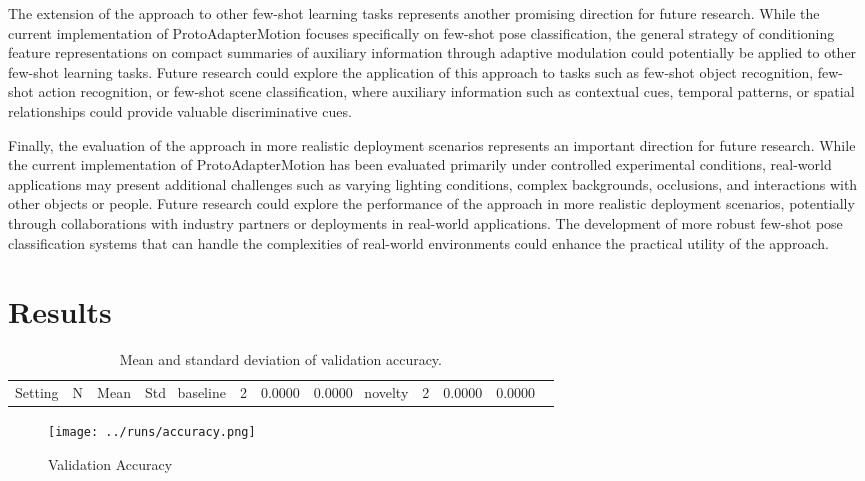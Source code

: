 \documentclass[11pt]{article}
\begin{document}
The extension of the approach to other few-shot learning tasks represents another promising direction for future research. While the current implementation of ProtoAdapterMotion focuses specifically on few-shot pose classification, the general strategy of conditioning feature representations on compact summaries of auxiliary information through adaptive modulation could potentially be applied to other few-shot learning tasks. Future research could explore the application of this approach to tasks such as few-shot object recognition, few-shot action recognition, or few-shot scene classification, where auxiliary information such as contextual cues, temporal patterns, or spatial relationships could provide valuable discriminative cues.

Finally, the evaluation of the approach in more realistic deployment scenarios represents an important direction for future research. While the current implementation of ProtoAdapterMotion has been evaluated primarily under controlled experimental conditions, real-world applications may present additional challenges such as varying lighting conditions, complex backgrounds, occlusions, and interactions with other objects or people. Future research could explore the performance of the approach in more realistic deployment scenarios, potentially through collaborations with industry partners or deployments in real-world applications. The development of more robust few-shot pose classification systems that can handle the complexities of real-world environments could enhance the practical utility of the approach.
\section*{Results}
\begin{table}[h!]\centering\begin{tabular}{lrrr}\hline Setting & N & Mean & Std \ \hline baseline & 2 & 0.0000 & 0.0000 \  novelty & 2 & 0.0000 & 0.0000 \  \hline\end{tabular}\caption{Mean and standard deviation of validation accuracy.}\end{table}
\begin{figure}[h!]\centering\texttt{[image: ../runs/accuracy.png]}\caption{Validation Accuracy}\end{figure}
\nocite{*}


\end{document}
